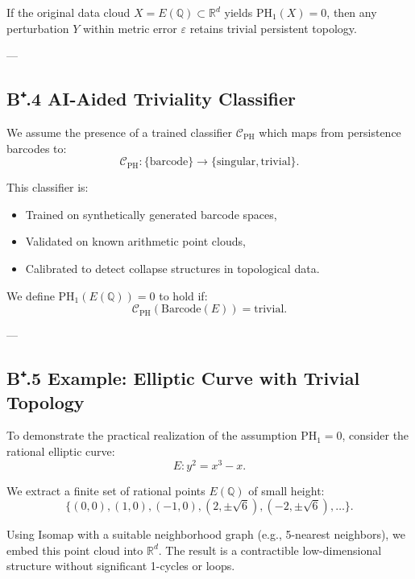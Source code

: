 \begin{corollary}
If the original data cloud \( X = E(\mathbb{Q}) \subset \mathbb{R}^d \) yields \( \mathrm{PH}_1(X) = 0 \),  
then any perturbation \( Y \) within metric error \( \varepsilon \) retains trivial persistent topology.
\end{corollary}


---

\subsection*{B⁺.4 AI-Aided Triviality Classifier}

We assume the presence of a trained classifier \( \mathcal{C}_{\mathrm{PH}} \) which maps from persistence barcodes to:
\[
\mathcal{C}_{\mathrm{PH}}: \{\text{barcode}\} \to \{\text{singular}, \text{trivial}\}.
\]

This classifier is:
\begin{itemize}
  \item Trained on synthetically generated barcode spaces,
  \item Validated on known arithmetic point clouds,
  \item Calibrated to detect collapse structures in topological data.
\end{itemize}

\begin{definition}
We define \( \mathrm{PH}_1(E(\mathbb{Q})) = 0 \) to hold if:
\[
\mathcal{C}_{\mathrm{PH}}(\text{Barcode}(E)) = \text{trivial}.
\]
\end{definition}

---

\subsection*{B⁺.5 Example: Elliptic Curve with Trivial Topology}

To demonstrate the practical realization of the assumption \( \mathrm{PH}_1 = 0 \),  
consider the rational elliptic curve:
\[
E: y^2 = x^3 - x.
\]

We extract a finite set of rational points \( E(\mathbb{Q}) \) of small height:
\[
\{(0,0), (1,0), (-1,0), (2, \pm \sqrt{6}), (-2, \pm \sqrt{6}), \dots\}.
\]

Using Isomap with a suitable neighborhood graph (e.g., 5-nearest neighbors), we embed this point cloud into \( \mathbb{R}^d \).  
The result is a contractible low-dimensional structure without significant 1-cycles or loops.


